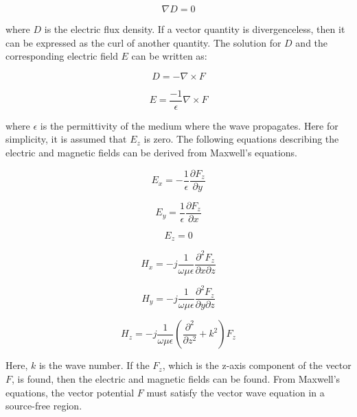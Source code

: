 \documentclass[a4paper,12pt]{report}
\begin{document}
\begin{equation}
  \nabla D = 0
\end{equation}

where $D$ is the electric flux density.
If a vector quantity is divergenceless,
then it can be expressed as the curl of another quantity.
The solution for $D$ and the corresponding electric field $E$
can be written as:

\begin{equation}
  D = -\nabla \times F
\end{equation}

\begin{equation}
  E = \frac{-1}{\epsilon}\nabla \times F
\end{equation}

where $\epsilon$ is the permittivity of the medium where the wave propagates.
Here for simplicity, it is assumed that $E_z$ is zero.
The following equations describing the electric and magnetic fields can be derived from Maxwell's equations.

\begin{equation}
  E_x = -\frac{1}{\epsilon}\frac{\partial F_z}{\partial y}
\end{equation}

\begin{equation}
  E_y = \frac{1}{\epsilon}\frac{\partial F_z}{\partial x}
\end{equation}

\begin{equation}
  E_z = 0
\end{equation}

\begin{equation}
  H_x = -j\frac{1}{\omega\mu\epsilon}\frac{\partial^2F_z}{\partial x \partial z}
\end{equation}

\begin{equation}
  H_y = -j\frac{1}{\omega\mu\epsilon}\frac{\partial^2F_z}{\partial y \partial z}
\end{equation}

\begin{equation}
  H_z = -j\frac{1}{\omega\mu\epsilon}(\frac{\partial^2}{\partial z^2} + k^2)F_z
\end{equation}

Here, $k$ is the wave number.
If the $F_z$, which is the z-axis component of the vector $F$, is found,
then the electric and magnetic fields can be found.
From Maxwell's equations, the vector potential $F$ must satisfy the vector wave equation
in a source-free region.
\end{document}
